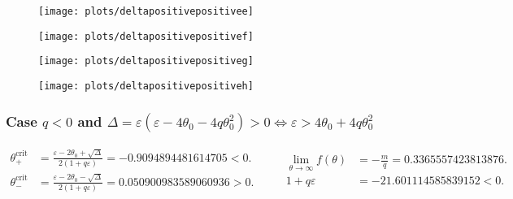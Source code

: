 \documentclass[
    8pt,
    aspectratio=1610,
    c,
    intlimits,
    leqno,
    professionalfonts,
]{beamer}
\begin{document}

\begin{frame}
	\begin{figure}[ht!]
		\centering
		\texttt{[image: plots/deltapositivepositivee]}
	\end{figure}
\end{frame}

\begin{frame}
	\begin{figure}[ht!]
		\centering
		\texttt{[image: plots/deltapositivepositivef]}
	\end{figure}
\end{frame}

\begin{frame}
	\begin{figure}[ht!]
		\centering
		\texttt{[image: plots/deltapositivepositiveg]}
	\end{figure}
\end{frame}

\begin{frame}
	\begin{figure}[ht!]
		\centering
		\texttt{[image: plots/deltapositivepositiveh]}
	\end{figure}
\end{frame}

\begin{frame}
	\frametitle{Case $q<0$ and
		\begin{math}
			\Delta=
			\varepsilon\left(\varepsilon-4\theta_{0}-4q\theta^{2}_{0}\right)>
			0\iff\varepsilon>4\theta_{0}+4q\theta^{2}_{0}
		\end{math}
	}

	\begin{equation*}
		\begin{aligned}
			\theta^{\text{crit}}_{+} & =
			\frac{
				\varepsilon-2\theta_{0}+\sqrt{\Delta}
			}{
				2\left(1+q\varepsilon\right)
			}=
			-0.9094894481614705<
			0.                           \\
			\theta^{\text{crit}}_{-} & =
			\frac{
				\varepsilon-2\theta_{0}-\sqrt{\Delta}
			}{
				2\left(1+q\varepsilon\right)
			}=
			0.050900983589060936
			>0.
		\end{aligned}\qquad
		\begin{aligned}
			\lim_{\theta\to\infty}f\left(\theta\right) & =
			-\frac{m}{q}=
			0.3365557423813876.                            \\
			1+q\varepsilon                             & =
			-21.601114585839152<0.
		\end{aligned}
	\end{equation*}
\end{frame}
\end{document}
